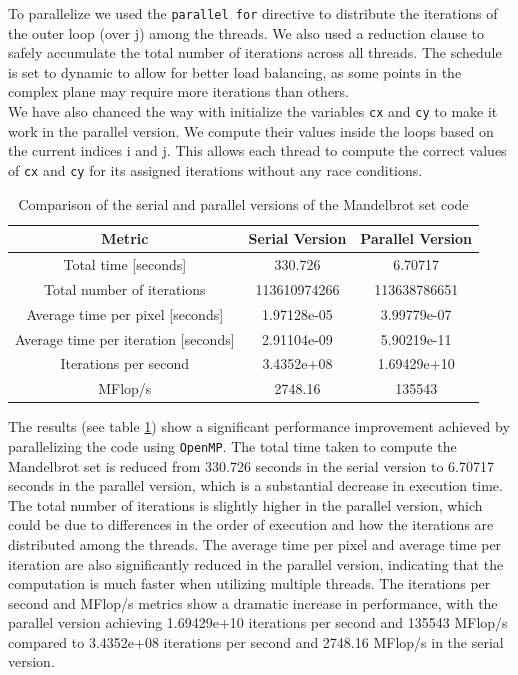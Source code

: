 \documentclass[unicode,10pt,a4paper,oneside,numbers=endperiod,openany]{scrartcl}
\begin{document}
To parallelize we used the \texttt{parallel for} directive to distribute the iterations of the outer loop (over j) among the threads. We also used a reduction clause to safely accumulate the total number of iterations across all threads. The schedule is set to dynamic to allow for better load balancing, as some points in the complex plane may require more iterations than others.\\
We have also chanced the way with initialize the variables \texttt{cx} and \texttt{cy} to make it work in the parallel version. We compute their values inside the loops based on the current indices i and j. This allows each thread to compute the correct values of \texttt{cx} and \texttt{cy} for its assigned iterations without any race conditions.\\

\begin{table}[!h]
\centering
\begin{tabular}{|c|c|c|}
\hline
Metric & Serial Version & Parallel Version \\
\hline
Total time [seconds] & 330.726 & 6.70717 \\
Total number of iterations & 113610974266 & 113638786651 \\
Average time per pixel [seconds] & 1.97128e-05 & 3.99779e-07 \\
Average time per iteration [seconds] & 2.91104e-09 & 5.90219e-11 \\
Iterations per second & 3.4352e+08 & 1.69429e+10 \\
MFlop/s & 2748.16 & 135543 \\
\hline
\end{tabular}
\caption{Comparison of the serial and parallel versions of the Mandelbrot set code}
\label{tab:mandelbrot_results}
\end{table}

The results (see table \ref{tab:mandelbrot_results}) show a significant performance improvement achieved by parallelizing the code using \texttt{OpenMP}. The total time taken to compute the Mandelbrot set is reduced from 330.726 seconds in the serial version to 6.70717 seconds in the parallel version, which is a substantial decrease in execution time. The total number of iterations is slightly higher in the parallel version, which could be due to differences in the order of execution and how the iterations are distributed among the threads. The average time per pixel and average time per iteration are also significantly reduced in the parallel version, indicating that the computation is much faster when utilizing multiple threads. The iterations per second and MFlop/s metrics show a dramatic increase in performance, with the parallel version achieving 1.69429e+10 iterations per second and 135543 MFlop/s compared to 3.4352e+08 iterations per second and 2748.16 MFlop/s in the serial version.
\end{document}
